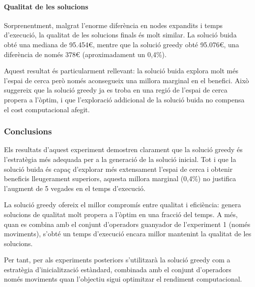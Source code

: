 \paragraph{Qualitat de les solucions}

\vspace{0.5cm}

\vspace{0.5cm}

Sorprenentment, malgrat l'enorme diferència en nodes expandits i temps d'execució, la qualitat de les solucions finals és molt similar. La solució buida obté una mediana de 95.454€, mentre que la solució greedy obté 95.076€, una diferència de només 378€ (aproximadament un 0,4\%).

Aquest resultat és particularment rellevant: la solució buida explora molt més l'espai de cerca però només aconsegueix una millora marginal en el benefici. Això suggereix que la solució greedy ja es troba en una regió de l'espai de cerca propera a l'òptim, i que l'exploració addicional de la solució buida no compensa el cost computacional afegit.

\vspace{0.5cm}


\subsubsection{Conclusions}

Els resultats d'aquest experiment demostren clarament que la solució greedy és l'estratègia més adequada per a la generació de la solució inicial. Tot i que la solució buida és capaç d'explorar més extensament l'espai de cerca i obtenir beneficis lleugerament superiors, aquesta millora marginal (0,4\%) no justifica l'augment de 5 vegades en el temps d'execució.

La solució greedy ofereix el millor compromís entre qualitat i eficiència: genera solucions de qualitat molt propera a l'òptim en una fracció del temps. A més, quan es combina amb el conjunt d'operadors guanyador de l'experiment 1 (només moviments), s'obté un temps d'execució encara millor mantenint la qualitat de les solucions.

Per tant, per als experiments posteriors s'utilitzarà la solució greedy com a estratègia d'inicialització estàndard, combinada amb el conjunt d'operadors només moviments quan l'objectiu sigui optimitzar el rendiment computacional.